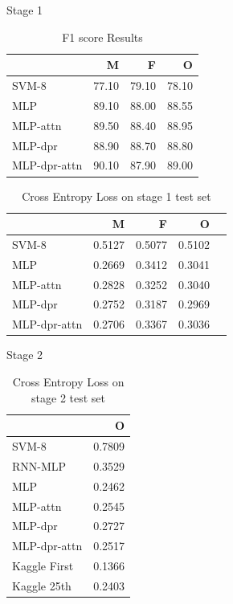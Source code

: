 \documentclass[10pt]{beamer}
\begin{document}
\begin{frame}{Stage 1}
  \begin{table}
    \centering
    \begin{tabular}{|l|r|r|r|}
      \hline
      & M & F & O \\
      \hline
      SVM-8 & 77.10 & 79.10 & 78.10 \\
      \hline
      MLP             & 89.10 &88.00 & 88.55 \\
      MLP-attn         &  89.50 & 88.40 & 88.95 \\
      MLP-dpr           & 88.90 & 88.70 & 88.80 \\
      MLP-dpr-attn    & 90.10 & 87.90 & 89.00 \\
      \hline
    \end{tabular}
    \caption{F1 score Results}
    \label{tab:f1}
  \end{table}

  \begin{table}
    \centering
    \begin{tabular}{|l|r|r|r|r|}
      \hline
      &M & F & O \\
      \hline
      SVM-8          & 0.5127 & 0.5077 & 0.5102 \\
      \hline
      MLP  & 0.2669 & 0.3412 & 0.3041 \\
      MLP-attn   & 0.2828 & 0.3252 & 0.3040 \\
      MLP-dpr      & 0.2752 & 0.3187 & 0.2969 \\
      MLP-dpr-attn & 0.2706 & 0.3367 & 0.3036 \\
      \hline
    \end{tabular}
    \caption{Cross Entropy Loss on stage 1 test set}
    \label{tab:ce1}
  \end{table}
\end{frame}

\begin{frame}{Stage 2} 
  \begin{table}
    \centering
    \begin{tabular}{|l|r|}
      \hline
      & O \\
      \hline
      SVM-8          &  0.7809 \\
      \hline
      RNN-MLP & 0.3529 \\
      \hline
      MLP  & 0.2462 \\
      MLP-attn   & 0.2545 \\
      MLP-dpr      & 0.2727 \\
      MLP-dpr-attn & 0.2517 \\
      \hline
      Kaggle First & 0.1366 \\
      Kaggle 25th & 0.2403 \\
      \hline
    \end{tabular}
    \caption{Cross Entropy Loss on stage 2 test set}
    \label{tab:ce2}
  \end{table}
\end{frame}
\end{document}
